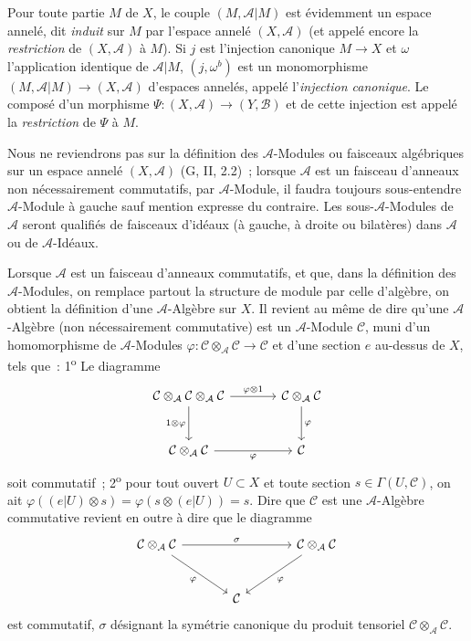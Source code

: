 \begin{env}[4.1.2]
\label{0.4.1.2-fr}
Pour toute partie $M$ de $X$, le couple $(M,\mathcal{A}|M)$ est évidemment un
espace annelé, dit \emph{induit} sur $M$ par l'espace annelé
$(X,\mathcal{A})$ (et appelé encore la \emph{restriction} de
$(X,\mathcal{A})$ à $M$). Si $j$ est l'injection canonique $M\to X$ et
$\omega$ l'application identique de $\mathcal{A}|M$, $(j,\omega^b)$ est un
monomorphisme $(M,\mathcal{A}|M)\to(X,\mathcal{A})$ d'espaces annelés, appelé
l'\emph{injection canonique}. Le composé d'un morphisme
$\Psi:(X,\mathcal{A})\to(Y,\mathcal{B})$ et de cette injection est appelé la
\emph{restriction} de $\Psi$ à $M$.
\end{env}

\begin{env}[4.1.3]
\label{0.4.1.3-fr}
Nous ne reviendrons pas sur la définition des $\mathcal{A}$-Modules ou
faisceaux algébriques sur un espace annelé $(X,\mathcal{A})$
(G, II, 2.2)~; lorsque $\mathcal{A}$ est un faisceau d'anneaux non
nécessairement commutatifs, par $\mathcal{A}$-Module, il faudra toujours
sous-entendre \og $\mathcal{A}$-Module à gauche\fg{} sauf mention expresse du
contraire. Les sous-$\mathcal{A}$-Modules de $\mathcal{A}$ seront qualifiés de
faisceaux d'idéaux (à gauche, à droite ou bilatères) dans $\mathcal{A}$ ou de
$\mathcal{A}$-Idéaux.

Lorsque $\mathcal{A}$ est un faisceau d'anneaux commutatifs, et que, dans la
définition des $\mathcal{A}$-Modules, on remplace partout la structure de
module par celle d'algèbre, on obtient la définition d'une
$\mathcal{A}$-Algèbre sur $X$. Il revient au même de dire qu'une
$\mathcal{A}$-Algèbre (non nécessairement commutative) est un
$\mathcal{A}$-Module $\mathcal{C}$, muni d'un homomorphisme de
$\mathcal{A}$-Modules
$\varphi:\mathcal{C}\otimes_{\mathcal{A}}\mathcal{C}\to\mathcal{C}$ et
d'une section $e$ au-dessus de $X$, tels que~: 1\textsuperscript{o} Le diagramme
\[
\begin{tikzcd}[column sep=large,row sep=large]
\mathcal{C}\otimes_{\mathcal{A}}\mathcal{C}\otimes_{\mathcal{A}}\mathcal{C}
  \arrow[r,"\varphi\otimes 1"]
  \arrow[d,"1\otimes\varphi"']
&
\mathcal{C}\otimes_{\mathcal{A}}\mathcal{C}
  \arrow[d,"\varphi"]
\\
\mathcal{C}\otimes_{\mathcal{A}}\mathcal{C}
  \arrow[r,"\varphi"']
&
\mathcal{C}
\end{tikzcd}
\]
soit commutatif~; 2\textsuperscript{o} pour tout ouvert $U\subset X$ et toute section
$s\in\Gamma(U,\mathcal{C})$, on ait
$\varphi((e|U)\otimes s)=\varphi(s\otimes(e|U))=s$. Dire que
$\mathcal{C}$ est une $\mathcal{A}$-Algèbre commutative revient en outre à
dire que le diagramme
\[
\begin{tikzcd}[column sep=large,row sep=large]
\mathcal{C}\otimes_{\mathcal{A}}\mathcal{C}
  \arrow[rr,"\sigma"]
  \arrow[dr,"\varphi"']
&&
\mathcal{C}\otimes_{\mathcal{A}}\mathcal{C}
  \arrow[dl,"\varphi"]
\\
& \mathcal{C} &
\end{tikzcd}
\]
est commutatif, $\sigma$ désignant la symétrie canonique du produit tensoriel
$\mathcal{C}\otimes_{\mathcal{A}}\mathcal{C}$.


\end{env}
